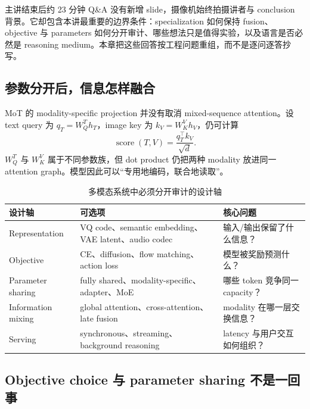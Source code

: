 \documentclass[a4paper]{article}
\begin{document}
主讲结束后约 23 分钟 Q\&A 没有新增 slide，摄像机始终拍摄讲者与 conclusion 背景。它却包含本讲最重要的边界条件：specialization 如何保持 fusion、objective 与 parameters 如何分开审计、哪些想法只是值得实验，以及语言是否必然是 reasoning medium。本章把这些回答按工程问题重组，而不是逐问逐答抄写。

\subsection{参数分开后，信息怎样融合}

MoT 的 modality-specific projection 并没有取消 mixed-sequence attention。设 text query 为 $q_T=W_Q^T h_T$，image key 为 $k_V=W_K^V h_V$，仍可计算
$$
\operatorname{score}(T,V)=\frac{q_T^\top k_V}{\sqrt{d}}.
$$
$W_Q^T$ 与 $W_K^V$ 属于不同参数族，但 dot product 仍把两种 modality 放进同一 attention graph。模型因此可以“专用地编码，联合地读取”。


\begin{table}[H]
\centering
\small
\begin{tabularx}{0.98\textwidth}{L{0.23\textwidth}Y Y}
\toprule
设计轴 & 可选项 & 核心问题 \\
\midrule
Representation & VQ code、semantic embedding、VAE latent、audio codec & 输入/输出保留了什么信息？ \\
Objective & CE、diffusion、flow matching、action loss & 模型被奖励预测什么？ \\
Parameter sharing & fully shared、modality-specific、adapter、MoE & 哪些 token 竞争同一 capacity？ \\
Information mixing & global attention、cross-attention、late fusion & modality 在哪一层交换信息？ \\
Serving & synchronous、streaming、background reasoning & latency 与用户交互如何组织？ \\
\bottomrule
\end{tabularx}
\caption{多模态系统中必须分开审计的设计轴}
\end{table}

\subsection{Objective choice 与 parameter sharing 不是一回事}
\end{document}
